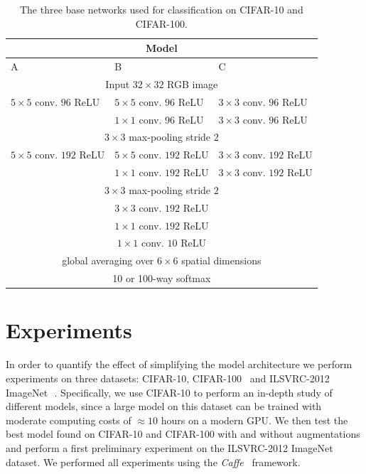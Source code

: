 \documentclass{article} %
\begin{document}

\begin{table}[h]
\caption{The three base networks used for classification on CIFAR-10
  and CIFAR-100.}
\label{base-models}
\begin{center}
\begin{small}
\begin{tabular}{l|l|l}
\multicolumn{3}{c}{\bf Model} \\
\hline
A         &B & C \\
\hline
\multicolumn{3}{c}{Input $32 \times 32$ RGB image} \\
\hline
$5 \times 5$ conv. $96$ ReLU & $5 \times 5$ conv. $96$ ReLU & $3 \times 3$ conv. $96$ ReLU \\
 & $1 \times 1$ conv. $96$ ReLU & $3 \times 3$ conv. $96$ ReLU \\
\hline 
\multicolumn{3}{c}{$3 \times 3$ max-pooling stride $2$} \\ 
\hline
$5 \times 5$ conv. $192$ ReLU & $5 \times 5$ conv. $192$ ReLU & $3 \times 3$ conv. $192$ ReLU \\
 & $1 \times 1$ conv. $192$ ReLU & $3 \times 3$ conv. $192$ ReLU \\
\hline
\multicolumn{3}{c}{$3 \times 3$ max-pooling stride $2$} \\
\hline
\multicolumn{3}{c}{$3 \times 3$ conv. $192$ ReLU} \\
\hline
\multicolumn{3}{c}{$1 \times 1$ conv. $192$ ReLU} \\
\hline
\multicolumn{3}{c}{$1 \times 1$ conv. $10$ ReLU} \\
\hline
\multicolumn{3}{c}{global averaging over $6\times6$ spatial dimensions} \\
\hline
\multicolumn{3}{c}{10 or 100-way softmax} \\
\end{tabular}
\end{small}
\end{center}
\end{table}

\section{Experiments}
In order to quantify the effect of simplifying the model architecture
we perform experiments on three datasets: CIFAR-10, CIFAR-100~\citep{Krizhevsky2009} and ILSVRC-2012 ImageNet~\citep{Imagenet_2009}\,. Specifically, we use CIFAR-10 to perform an in-depth
study of different models, since a large model on this dataset can be trained with
moderate computing costs of $\approx 10$ hours on a modern GPU. We
then test the best model found on CIFAR-10 and CIFAR-100 with and
without augmentations and perform a first preliminary experiment on
the ILSVRC-2012 ImageNet dataset. We performed all experiments using the \emph{Caffe}~\citep{caffe} framework.
\end{document}
